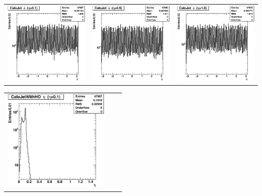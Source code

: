 \documentclass{cmspaper}
\begin{document}
\begin{appendices}
\begin{center}
\begin{tabular}{lll}
 \end{tabular}
\end{center}
\begin{center}
 \begin{tabular}{lll}
  \includegraphics[width=2in]{figs/h_CaloJetPhi_corr_eta0.1.eps} &
  \includegraphics[width=2in]{figs/h_CaloJetPhi_corr_eta0.5.eps} &
  \includegraphics[width=2in]{figs/h_CaloJetPhi_corr_eta1.0.eps} \\
 \end{tabular}
\end{center}
\begin{center}
 \begin{tabular}{lll}
  \includegraphics[width=2in]{figs/h_CaloJetWithHOEta_corr_eta0.1.eps} &

\end{tabular}
\end{center}
\end{appendices}
\end{document}
